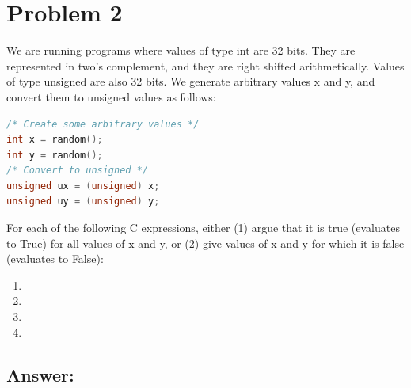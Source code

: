 
\section*{Problem 2}

We are running programs where values of type int are 32 bits. They are represented in two's complement, and they are right shifted arithmetically. Values of type unsigned are also 32 bits. We generate arbitrary values x and y, and convert them to unsigned values as follows:

\begin{lstlisting}[frame=tb, language=C++]
/* Create some arbitrary values */
int x = random();
int y = random();
/* Convert to unsigned */
unsigned ux = (unsigned) x;
unsigned uy = (unsigned) y;
\end{lstlisting}

\noindent For each of the following C expressions, either (1) argue that it is true (evaluates to True) for all values of x and y, or (2) give values of x and y for which it is false (evaluates to False):

\begin{enumerate}
    \item {}
    \item {}
    \item {}
    \item {}
\end{enumerate}

\subsection*{Answer:}
